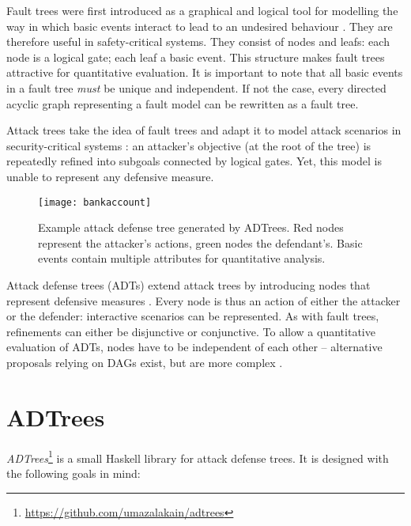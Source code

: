 \documentclass{scrreprt}
\begin{document}
Fault trees were first introduced as a graphical and logical tool for modelling
the way in which basic events interact to lead to an undesired behaviour
\cite[IV.1]{Vesely1981}. They are therefore useful in safety-critical systems.
They consist of nodes and leafs: each node is a logical gate; each leaf a basic
event. This structure makes fault trees attractive for quantitative evaluation.
It is important to note that all basic events in a fault tree \textit{must} be
unique and independent. If not the case, every directed acyclic graph
representing a fault model can be rewritten as a fault tree.  

Attack trees take the idea of fault trees and adapt it to model attack scenarios
in security-critical systems \cite{Schneier1999} \cite{Brooke2003}
\cite{NaiFovino2009}: an attacker's objective (at the root of the tree) is
repeatedly refined into subgoals connected by logical gates. Yet, this model is
unable to represent any defensive measure.

\begin{figure}[h!]
    \label{example-adt}
    \centering
    \texttt{[image: bankaccount]}
    \caption{Example attack defense tree generated by ADTrees. Red nodes
    represent the attacker's actions, green nodes the defendant's. Basic events
    contain multiple attributes for quantitative analysis.}
\end{figure}

Attack defense trees (ADTs) extend attack trees by introducing nodes that
represent defensive measures \cite{KordyFoundations}. Every node is thus an
action of either the attacker or the defender: interactive scenarios can be
represented.  As with fault trees, refinements can either be disjunctive or
conjunctive. To allow a quantitative evaluation of ADTs, nodes have to be
independent of each other -- alternative proposals relying on DAGs exist, but
are more complex \cite{KordyDAG}.



\section{ADTrees}

\textit{ADTrees}\footnote{\url{https://github.com/umazalakain/adtrees}}
is a small Haskell library for attack defense trees. It is designed with the
following goals in mind:
\end{document}
